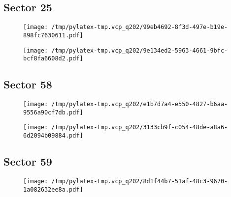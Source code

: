 \documentclass{report}%
\begin{document}
%
\subsection{Sector 25}%
\label{subsec:40298066425}%


\begin{figure}[H]%
\begin{center}%
\centering%
\texttt{[image: /tmp/pylatex-tmp.vcp\_q202/99eb4692-8f3d-497e-b19e-898fc7630611.pdf]}%
\end{center}%
\end{figure}

%


\begin{figure}[H]%
\begin{center}%
\centering%
\texttt{[image: /tmp/pylatex-tmp.vcp\_q202/9e134ed2-5963-4661-9bfc-bcf8fa6608d2.pdf]}%
\end{center}%
\end{figure}

%
\subsection{Sector 58}%
\label{subsec:40298066458}%


\begin{figure}[H]%
\begin{center}%
\centering%
\texttt{[image: /tmp/pylatex-tmp.vcp\_q202/e1b7d7a4-e550-4827-b6aa-9556a90cf7db.pdf]}%
\end{center}%
\end{figure}

%


\begin{figure}[H]%
\begin{center}%
\centering%
\texttt{[image: /tmp/pylatex-tmp.vcp\_q202/3133cb9f-c054-48de-a8a6-6d2094b09884.pdf]}%
\end{center}%
\end{figure}

%
\subsection{Sector 59}%
\label{subsec:40298066459}%


\begin{figure}[H]%
\begin{center}%
\centering%
\texttt{[image: /tmp/pylatex-tmp.vcp\_q202/8d1f44b7-51af-48c3-9670-1a082632ee8a.pdf]}%
\end{center}%
\end{figure}
\end{document}
